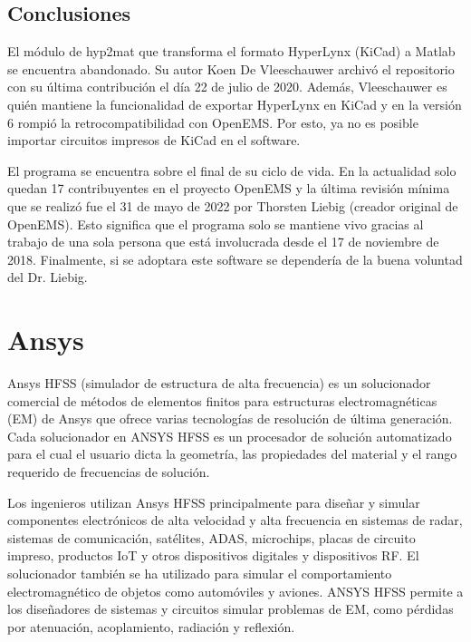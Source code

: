 \documentclass[
    11pt,
    spanish,
    a4paper
]{article}
\begin{document}
\subsection{Conclusiones}

El módulo de hyp2mat que transforma el formato HyperLynx (KiCad) a Matlab se encuentra abandonado.
Su autor Koen De Vleeschauwer archivó el repositorio con su última contribución el día 22 de julio de 2020.
Además, Vleeschauwer es quién mantiene la funcionalidad de exportar HyperLynx en KiCad y en la versión 6 rompió la retrocompatibilidad con OpenEMS.
Por esto, ya no es posible importar circuitos impresos de KiCad en el software.

El programa se encuentra sobre el final de su ciclo de vida.
En la actualidad solo quedan 17 contribuyentes en el proyecto OpenEMS y la última revisión mínima que se realizó fue el 31 de mayo de 2022 por Thorsten Liebig (creador original de OpenEMS).
Esto significa que el programa solo se mantiene vivo gracias al trabajo de una sola persona que está involucrada desde el 17 de noviembre de 2018.
Finalmente, si se adoptara este software se dependería de la buena voluntad del Dr. Liebig.

\newpage


\section{Ansys}

Ansys HFSS (simulador de estructura de alta frecuencia) es un solucionador comercial de métodos de elementos finitos para estructuras electromagnéticas (EM) de Ansys que ofrece varias tecnologías de resolución de última generación.
Cada solucionador en ANSYS HFSS es un procesador de solución automatizado para el cual el usuario dicta la geometría, las propiedades del material y el rango requerido de frecuencias de solución.

Los ingenieros utilizan Ansys HFSS principalmente para diseñar y simular componentes electrónicos de alta velocidad y alta frecuencia en sistemas de radar, sistemas de comunicación, satélites, ADAS, microchips, placas de circuito impreso, productos IoT y otros dispositivos digitales y dispositivos RF.
El solucionador también se ha utilizado para simular el comportamiento electromagnético de objetos como automóviles y aviones.
ANSYS HFSS permite a los diseñadores de sistemas y circuitos simular problemas de EM, como pérdidas por atenuación, acoplamiento, radiación y reflexión.
\end{document}
